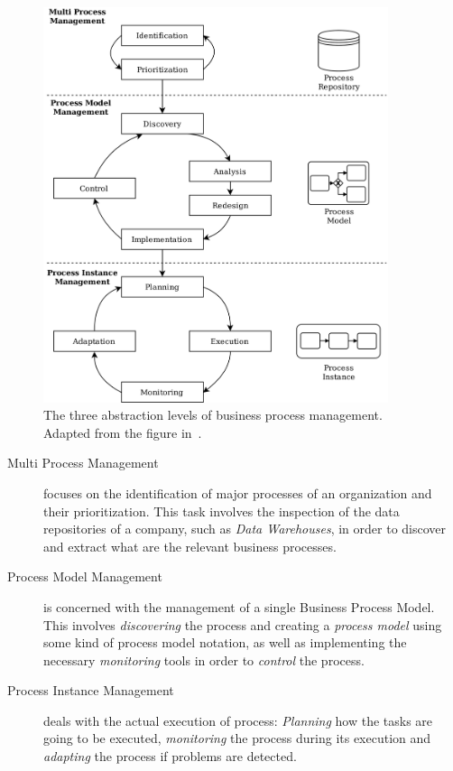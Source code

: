\begin{figure}[htb]
  \centering
  \includegraphics[width=0.9\textwidth]{figures/bpm_three_layers}
  \caption{The three abstraction levels of business process management. Adapted
    from the figure in~\cite{mendling2017challenges}.}
  \label{fig:threelevels}
\end{figure}

\begin{description}
  \item[Multi Process Management]{ focuses on the identification of major
      processes of an organization and their prioritization. This task
      involves the inspection of the data repositories of a company, such as
      \emph{Data Warehouses}, in order to discover and extract 
      what are the relevant business processes.}
  \item[Process Model Management]{ is concerned with the management of a single
      Business Process Model. This involves \emph{discovering} the process and
      creating a \emph{process model} using some kind of process model notation,
      as well as implementing the necessary \emph{monitoring} tools in order to
      \emph{control} the process.}
  \item[Process Instance Management]{ deals with the actual execution of
      process: \emph{Planning} how the tasks are going to be executed,
      \emph{monitoring} the process during its execution and \emph{adapting} the
      process if problems are detected.}
\end{description}


